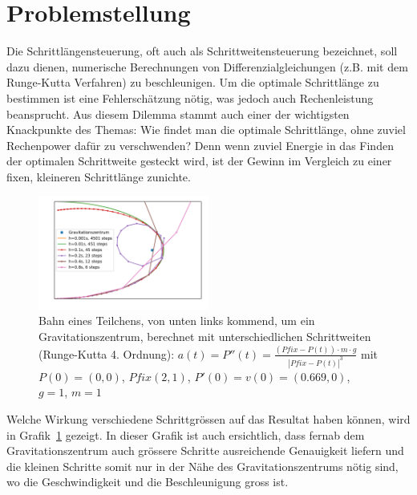 %
%
%
\section{Problemstellung
\label{steps:section:problemstellung}}
Die Schrittlängensteuerung, oft auch als Schrittweitensteuerung bezeichnet,
soll dazu dienen, numerische Berechnungen von Differenzialgleichungen (z.B. mit dem Runge-Kutta Verfahren) zu beschleunigen.
Um die optimale Schrittlänge zu bestimmen ist eine Fehlerschätzung nötig,
was jedoch auch Rechenleistung beansprucht.
Aus diesem Dilemma stammt auch einer der wichtigsten Knackpunkte des Themas:
Wie findet man die optimale Schrittlänge, ohne zuviel Rechenpower dafür zu verschwenden?
Denn wenn zuviel Energie in das Finden der optimalen Schrittweite gesteckt wird,
ist der Gewinn im Vergleich zu einer fixen, kleineren Schrittlänge zunichte.

\begin{figure}
\centering
\includegraphics[width=0.5\textwidth]{papers/steps/img/gravity_different_fixed_stepsize.pdf}
\caption{Bahn eines Teilchens, von unten links kommend,
um ein Gravitationszentrum, berechnet mit unterschiedlichen Schrittweiten (Runge-Kutta 4. Ordnung):
$a(t)=P''(t)=\frac{(Pfix-P(t))\cdot m\cdot g}{|Pfix-P(t)|^{3}}$
mit $P(0)=(0, 0)$, $Pfix(2, 1)$, $P'(0)=v(0)=(0.669, 0)$, $g=1$, $m=1$
\label{buch:steps:fixed_comparison}}
\end{figure}

Welche Wirkung verschiedene Schrittgrössen
auf das Resultat haben können, wird in Grafik~\ref{buch:steps:fixed_comparison} gezeigt.
In dieser Grafik ist auch ersichtlich, dass fernab dem Gravitationszentrum auch grössere Schritte
ausreichende Genauigkeit liefern und die kleinen Schritte somit nur in der Nähe des Gravitationszentrums
nötig sind, wo die Geschwindigkeit und die Beschleunigung gross ist.





